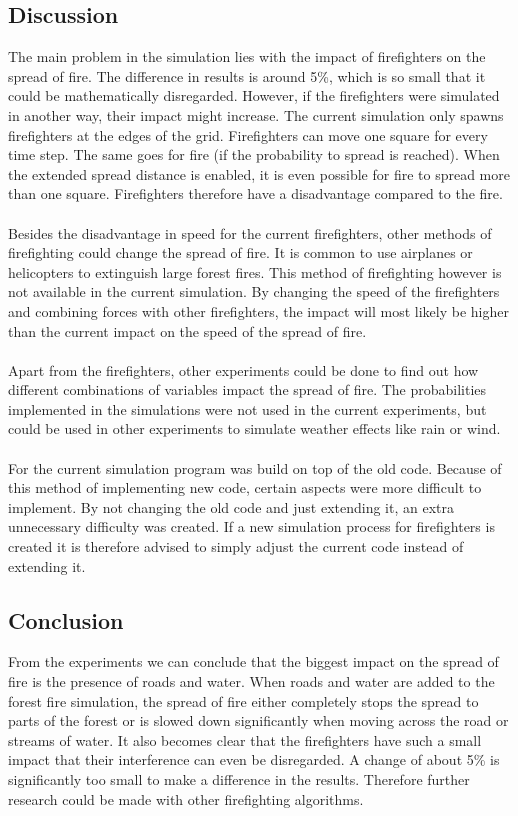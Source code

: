 \documentclass{article}
\begin{document}
\begin{multicols}{2}
\subsection*{Discussion}
The main problem in the simulation lies with the impact of firefighters on the spread of fire. The difference in results is around 5\%, which is so small that it could be mathematically disregarded. However, if the firefighters were simulated in another way, their impact might increase. The current simulation only spawns firefighters at the edges of the grid. Firefighters can move one square for every time step. The same goes for fire (if the probability to spread is reached). When the extended spread distance is enabled, it is even possible for fire to spread more than one square. Firefighters therefore have a disadvantage compared to the fire.\\\\ 
Besides the disadvantage in speed for the current firefighters, other methods of firefighting could change the spread of fire. It is common to use airplanes or helicopters to extinguish large forest fires. This method of firefighting however is not available in the current simulation. By changing the speed of the firefighters and combining forces with other firefighters, the impact will most likely be higher than the current impact on the speed of the spread of fire.\\\\
Apart from the firefighters, other experiments could be done to find out how different combinations of variables impact the spread of fire. The probabilities implemented in the simulations were not used in the current experiments, but could be used in other experiments to simulate weather effects like rain or wind.\\\\
For the current simulation program was build on top of the old code. Because of this method of implementing new code, certain aspects were more difficult to implement. By not changing the old code and just extending it, an extra unnecessary difficulty was created. If a new simulation process for firefighters is created it is therefore advised to simply adjust the current code instead of extending it.

\subsection*{Conclusion}
From the experiments we can conclude that the biggest impact on the spread of fire is the presence of roads and water. When roads and water are added to the forest fire simulation, the spread of fire either completely stops the spread to parts of the forest or is slowed down significantly when moving across the road or streams of water. It also becomes clear that the firefighters have such a small impact that their interference can even be disregarded. A change of about 5\% is significantly too small to make a difference in the results. Therefore further research could be made with other firefighting algorithms.\\\\

\nocite{*}


\end{multicols}
\end{document}
